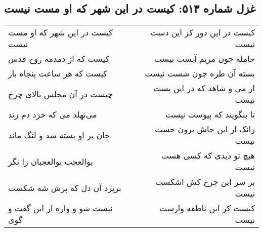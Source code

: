 \begin{center}
\section*{غزل شماره ۵۱۳: کیست در این شهر که او مست نیست}
\label{sec:0513}
\begin{longtable}{l p{0.5cm} r}
کیست در این شهر که او مست نیست
&&
کیست در این دور کز این دست نیست
\\
کیست که از دمدمه روح قدس
&&
حامله چون مریم آبست نیست
\\
کیست که هر ساعت پنجاه بار
&&
بسته آن طره چون شست نیست
\\
چیست در آن مجلس بالای چرخ
&&
از می و شاهد که در این پست نیست
\\
می‌نهلد می که خرد دم زند
&&
تا بنگویند که پیوست نیست
\\
جان بر او بسته شد و لنگ ماند
&&
زانک از این جاش برون جست نیست
\\
بوالعجب بوالعجبان را نگر
&&
هیچ تو دیدی که کسی هست نیست
\\
برپرد آن دل که پرش شه شکست
&&
بر سر این چرخ کش اشکست نیست
\\
نیست شو و واره از این گفت و گوی
&&
کیست کز این ناطقه وارست نیست
\\
\end{longtable}
\end{center}
